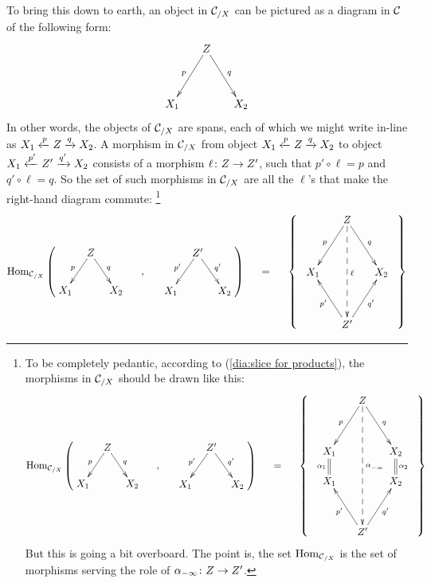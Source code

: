 \begin{construction}[Products]
To bring this down to earth, an object in $\mathcal{C}_{/X}$ can be pictured as a diagram in $\mathcal{C}$ of the following form:
$$\xymatrix@=15pt{&Z\ar[ldd]_p\ar[rdd]^q\\\\X_1&&X_2}$$   
In other words, the objects of $\mathcal{C}_{/X}$ are spans, each of which we might write in-line as $X_1\xleftarrow{p}Z\xrightarrow{q}X_2$. A morphism in $\mathcal{C}_{/X}$ from object $X_1\xleftarrow{p}Z\xrightarrow{q}X_2$ to object $X_1\xleftarrow{p'}Z'\xrightarrow{q'}X_2$ consists of a morphism $\ell\colon Z\rightarrow Z'$, such that $p'\circ\ell=p$ and $q'\circ\ell=q$. So the set of such morphisms in $\mathcal{C}_{/X}$ are all the $\ell$'s that make the right-hand diagram commute:
\footnote{To be completely pedantic, according to (\ref{dia:slice for products}), the morphisms in $\mathcal{C}_{/X}$ should be drawn like this:
\begin{align*}
\Hom_{\mcC_{/X}}\normalsize\left(\parbox{1in}{\xymatrix@=8pt{&Z\ar[ldd]_p\ar[rdd]^q\\\\X_1&&X_2}}\hspace{.2in},\hspace{.2in}\parbox{1in}{\xymatrix@=8pt{&Z'\ar[ldd]_{p'}\ar[rdd]^{q'}\\\\X_1&&X_2}}\right)\hspace{.2in}=\hspace{.2in}\left\{\;\;\parbox{1in}{\xymatrix@=15pt{&Z\ar[ldd]_{p}\ar[rdd]^{q}\ar@{-->}[ddddd]^{\alpha^{}_{-\infty}}\\\\X_1\ar@{=}[d]_{\alpha_1}&&X_2\ar@{=}[d]^{\alpha_2}\\X_1&&X_2\\\\&Z'\ar[uul]^{p'}\ar[uur]_{q'}}}\;\;\right\}
\end{align*}
But this is going a bit overboard. The point is, the set $\textnormal{Hom}_{\mathcal{C}_{/X}}$ is the set of morphisms serving the role of $\alpha_{-\infty}\colon Z\rightarrow Z'$.}
\begin{align}\label{dia:morphism of spans}
\Hom_{\mcC_{/X}}\normalsize\left(\parbox{1in}{\xymatrix@=8pt{&Z\ar[ldd]_p\ar[rdd]^q\\\\X_1&&X_2}}\hspace{.2in},\hspace{.2in}\parbox{1in}{\xymatrix@=8pt{&Z'\ar[ldd]_{p'}\ar[rdd]^{q'}\\\\X_1&&X_2}}\right)\hspace{.2in}=\hspace{.2in}\left\{\;\;\parbox{1in}{\xymatrix@=15pt{&Z\ar[ldd]_{p}\ar[rdd]^{q}\ar@{-->}[dddd]^\ell\\\\X_1&&X_2\\\\&Z'\ar[uul]^{p'}\ar[uur]_{q'}}}\;\;\right\}
\end{align}


\end{construction}
